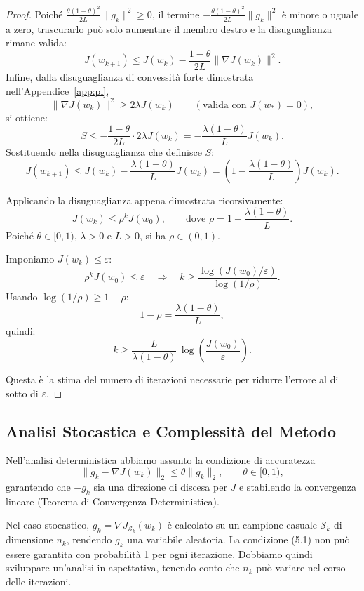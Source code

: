 \documentclass[italian, a4paper, twoside, binding=6mm]{sapthesis}
\begin{document}
\begin{proof}
  Poiché $\frac{\theta(1-\theta)^2}{2L}\|g_k\|^2 \ge 0$, il termine $-\frac{\theta(1-\theta)^2}{2L}\|g_k\|^2$ è minore o uguale a zero, trascurarlo può solo aumentare il membro destro e la disuguaglianza rimane valida:
  \[
  J(w_{k+1}) \le J(w_k) - \frac{1-\theta}{2L}\|\nabla J(w_k)\|^2.
  \]
  Infine, dalla disuguaglianza di convessità forte dimostrata nell'Appendice~\ref{app:pl},
  \[
  \|\nabla J(w_k)\|^2 \ge 2\lambda J(w_k) \qquad (\text{valida con } J(w_*)=0),
  \]
  si ottiene:
\[
S \le -\frac{1-\theta}{2L} \cdot 2\lambda J(w_k)
= -\frac{\lambda(1-\theta)}{L} J(w_k).
\]
Sostituendo nella disuguaglianza che definisce $S$:
\[
J(w_{k+1}) \le J(w_k) - \frac{\lambda(1-\theta)}{L} J(w_k)
= \left(1 - \frac{\lambda(1-\theta)}{L}\right) J(w_k).
\]

Applicando la disuguaglianza appena dimostrata ricorsivamente:
\[
J(w_k) \le \rho^k J(w_0), \qquad \text{dove } \rho = 1 - \frac{\lambda(1-\theta)}{L}.
\]
Poiché $\theta \in [0,1)$, $\lambda > 0$ e $L > 0$, si ha $\rho \in (0,1)$.

Imponiamo $J(w_k) \le \varepsilon$:
\[
\rho^k J(w_0) \le \varepsilon \quad\Longrightarrow\quad k \ge \frac{\log(J(w_0)/\varepsilon)}{\log(1/\rho)}.
\]
Usando $\log(1/\rho) \ge 1-\rho$:
\[
1 - \rho = \frac{\lambda(1-\theta)}{L},
\]
quindi:
\[
k \ge \frac{L}{\lambda(1-\theta)}\,\log\!\left(\frac{J(w_0)}{\varepsilon}\right).
\]

Questa è la stima del numero di iterazioni necessarie per ridurre l'errore al di sotto di $\varepsilon$.
\end{proof}


\subsection{Analisi Stocastica e Complessità del Metodo}

Nell'analisi deterministica abbiamo assunto la condizione di accuratezza
\[
\|g_k - \nabla J(w_k)\|_2 \le \theta \|g_k\|_2, \qquad \theta \in [0,1), \tag{5.1}
\]
garantendo che \(-g_k\) sia una direzione di discesa per \(J\) e stabilendo la convergenza lineare (Teorema di Convergenza Deterministica).

Nel caso stocastico, \(g_k = \nabla J_{\mathcal{S}_k}(w_k)\) è calcolato su un campione casuale \(\mathcal{S}_k\) di dimensione \(n_k\), rendendo \(g_k\) una variabile aleatoria. La condizione (5.1) non può essere garantita con probabilità 1 per ogni iterazione. Dobbiamo quindi sviluppare un'analisi in aspettativa, tenendo conto che \(n_k\) può variare nel corso delle iterazioni.
\end{document}
